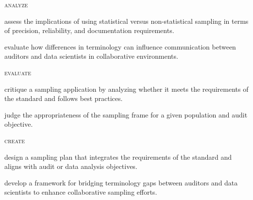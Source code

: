 \textsc{analyze}

\begin{compactitem}
\item assess the implications of using statistical versus non-statistical sampling in terms of precision, reliability, and documentation requirements.
\item evaluate how differences in terminology can influence communication between auditors and data scientists in collaborative environments.
\end{compactitem}

\textsc{evaluate}

\begin{compactitem}
\item critique a sampling application by analyzing whether it meets the requirements of the standard and follows best practices.
\item judge the appropriateness of the sampling frame for a given population and audit objective.
\end{compactitem}

\textsc{create}

\begin{compactitem}
\item design a sampling plan that integrates the requirements of the standard and aligns with audit or data analysis objectives.
\item develop a framework for bridging terminology gaps between auditors and data scientists to enhance collaborative sampling efforts.
\end{compactitem}


